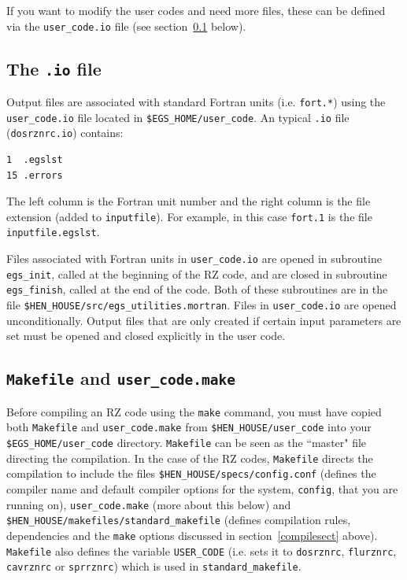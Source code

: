 \documentclass[12pt,twoside]{article}  %
\begin{document}
If you want to modify the user codes and need more files, these can be
defined via the {\tt user\_code.io} file (see section~\ref{iofilesect}
below).

\subsection{The {\tt .io} file}
\label{iofilesect}

Output files are associated with standard Fortran units (i.e. {\tt fort.*})
using the {\tt user\_code.io} file located in 
{\tt \$EGS\_HOME/user\_code}.  An typical {\tt .io} file
({\tt dosrznrc.io}) contains:
\begin{verbatim}
1  .egslst
15 .errors
\end{verbatim}
The left column is the Fortran unit number and the right column is the 
file extension (added to {\tt inputfile}).  For example, in this case
{\tt fort.1} is the file {\tt inputfile.egslst}.  

Files associated with Fortran units in {\tt user\_code.io} are opened
in subroutine {\tt egs\_init}, called at the
beginning of the RZ code, and are closed in subroutine
{\tt egs\_finish}, called at the end of the code.  Both of these subroutines
are in the file {\tt \$HEN\_HOUSE/src/egs\_utilities.mortran}.  Files 
in {\tt user\_code.io} are opened unconditionally.  
Output files that are only created if certain input parameters are set must
be opened and closed explicitly in the user code.

\subsection{{\tt Makefile} and {\tt user\_code.make}}
\label{makefilesect}

Before compiling an RZ code using the {\tt make}
command, you must have copied both
{\tt Makefile} and {\tt user\_code.make} from 
{\tt \$HEN\_HOUSE/user\_code} into your {\tt \$EGS\_HOME/user\_code}
directory.  {\tt Makefile} can be seen as the ``master" file directing
the compilation.  In the case of the RZ codes, {\tt Makefile} directs 
the compilation to include the files {\tt \$HEN\_HOUSE/specs/config.conf}
(defines the compiler name and default compiler options for the system,
{\tt config}, that you are running on), {\tt user\_code.make} (more about
this below) and {\tt \$HEN\_HOUSE/makefiles/standard\_makefile}
(defines compilation rules, dependencies and the {\tt make} options
discussed in section~\ref{compilesect} above).  {\tt Makefile} also
defines the variable {\tt USER\_CODE} (i.e. sets it to {\tt dosrznrc},
{\tt flurznrc}, {\tt cavrznrc} or {\tt sprrznrc}) which is used
in {\tt standard\_makefile}.
\end{document}
